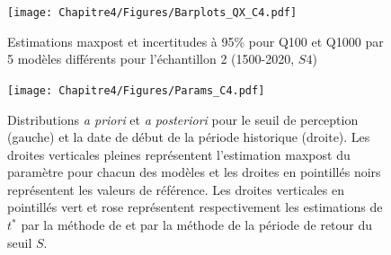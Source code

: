 	
	\begin{figure}[h]
		\centering
		\texttt{[image: Chapitre4/Figures/Barplots\_QX\_C4.pdf]}
		\caption{Estimations maxpost et incertitudes à 95\% pour Q100 et Q1000 par 5 modèles différents pour l'échantillon 2 (1500-2020, $S4$)}
		\label{fig:BarplotC4}
	\end{figure}
	
		\begin{table}[h]
	\centering
	\caption{Résultats maxpost et incertitudes de 6 modèles pour l'échantillon 2. Le modèle $D^*$ représente les résultats du modèle D avec des \textit{a priori} plus informatifs (section \ref{subsec:D*}). Q100 et Q1000 représentent respectivement le débit des crues centennales et millénales, $\xi$ le paramètre de forme de la distribution GEV, $S$ le seuil de perception et $t^{*}$ la date de début de la période historique. Les écarts type des distributions \textit{a posteriori} sont représentés par les colonnes débutant par la lettre "u".}
		\label{tab:ResC4}

	\end{table}
	

	\begin{figure}[h]
		\centering
		\texttt{[image: Chapitre4/Figures/Params\_C4.pdf]}	
		\caption{Distributions \textit{a priori} et \textit{a posteriori} pour le seuil de perception (gauche) et la date de début de la période historique (droite). Les droites verticales pleines représentent l'estimation maxpost du paramètre pour chacun des modèles et les droites en pointillés noirs représentent les valeurs de référence. Les droites verticales en pointillés vert et rose représentent respectivement les estimations de $t^{*}$ par la méthode de \citet{prosdocimi_german_2018} et par la méthode de la période de retour du seuil $S$.}
		\label{fig:Params_C4}
	\end{figure}

